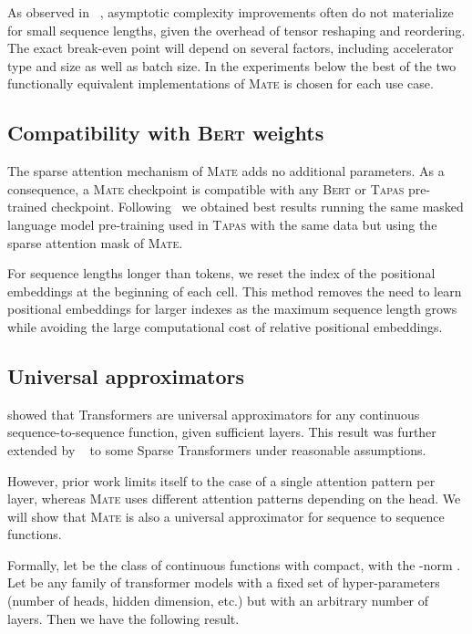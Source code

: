 \documentclass[11pt]{article}
\newcommand{\tapas}{\textsc{Tapas}\xspace}
\newcommand{\bert}{\textsc{Bert}\xspace}
\newcommand{\model}{\textsc{Mate}\xspace}
\begin{document}
As observed in ~\citet{ainslie-etal-2020-etc},  asymptotic complexity improvements
often do not materialize for small sequence lengths, given the overhead of
tensor reshaping and reordering. The exact break-even point will depend on several factors,
including accelerator type and size as well as batch size. 
In the experiments below the best of the two functionally equivalent implementations of \model is chosen for each use case.

\subsection{Compatibility with \bert weights}

The sparse attention mechanism of \model 
adds no additional parameters. As a consequence, a \model checkpoint is compatible with any \bert or \tapas pre-trained checkpoint. Following~\citet{herzig-etal-2020-tapas} we obtained best results running the same masked language model pre-training used in \tapas with the same data but using the sparse attention mask of \model.

For sequence lengths longer than  tokens, we reset the index of the positional embeddings at the beginning of each cell.
This method removes the need to learn positional embeddings for larger indexes as the maximum sequence length grows while avoiding the large computational cost of relative positional embeddings.



\subsection{Universal approximators}

\citet{Yun2020Are} showed that Transformers are universal approximators for any continuous sequence-to-sequence function, given sufficient layers.
This result was further extended by ~\citet{univapprox2020, zaheer2020bigbird} to some Sparse Transformers under reasonable assumptions. 

However, prior work limits itself to the case of a single attention pattern per layer, whereas \model uses different attention patterns depending on the head. We will show that \model is also a universal approximator for sequence to sequence functions.

Formally, let  be the class of continuous functions 
with  compact, with the -norm . Let  be any family of transformer models with a fixed set of hyper-parameters (number of heads, hidden dimension, etc.) but with an arbitrary number of layers. Then we have the following result.
\end{document}
